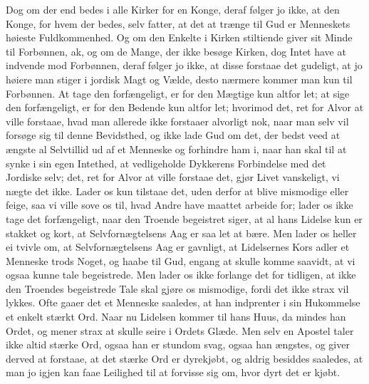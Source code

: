 \documentclass[12pt,a4paper]{article}
\begin{document}
Dog om der end bedes i alle Kirker for en Konge, deraf følger jo ikke, at den Konge, for hvem der bedes, selv fatter, at det at trænge til Gud er Menneskets høieste Fuldkommenhed. Og om den Enkelte i Kirken stiltiende giver sit Minde til Forbønnen, ak, og om de Mange, der ikke besøge Kirken, dog Intet have at indvende mod Forbønnen, deraf følger jo ikke, at disse forstaae det gudeligt, at jo høiere man stiger i jordisk Magt og Vælde, desto nærmere kommer man kun til Forbønnen. At tage den forfængeligt, er for den Mægtige kun altfor let; at sige den forfængeligt, er for den Bedende kun altfor let; hvorimod det, ret for Alvor at ville forstaae, hvad man allerede ikke forstaaer alvorligt nok, naar man selv vil forsøge sig til denne Bevidsthed, og ikke lade Gud om det, der bedst veed at ængste al Selvtillid ud af et Menneske og forhindre ham i, naar han skal til at synke i sin egen Intethed, at vedligeholde Dykkerens Forbindelse med det Jordiske selv; det, ret for Alvor at ville forstaae det, gjør Livet vanskeligt, vi nægte det ikke. Lader os kun tilstaae det, uden derfor at blive mismodige eller feige, saa vi ville sove os til, hvad Andre have maattet arbeide for; lader os ikke tage det forfængeligt, naar den Troende begeistret siger, at al hans Lidelse kun er stakket og kort, at Selvfornægtelsens Aag er saa let at bære. Men lader os heller ei tvivle om, at Selvfornægtelsens Aag er gavnligt, at Lidelsernes Kors adler et Menneske trods Noget, og haabe til Gud, engang at skulle komme saavidt, at vi ogsaa kunne tale begeistrede. Men lader os ikke forlange det for tidligen, at ikke den Troendes begeistrede Tale skal gjøre os mismodige, fordi det ikke strax vil lykkes. Ofte gaaer det et Menneske saaledes, at han indprenter i sin Hukommelse et enkelt stærkt Ord. Naar nu Lidelsen kommer til hans Huus, da mindes han Ordet, og mener strax at skulle seire i Ordets Glæde. Men selv en Apostel taler ikke altid stærke Ord, ogsaa han er stundom svag, ogsaa han ængstes, og giver derved at forstaae, at det stærke Ord er dyrekjøbt, og aldrig besiddes saaledes, at man jo igjen kan faae Leilighed til at forvisse sig om, hvor dyrt det er kjøbt.
\end{document}
